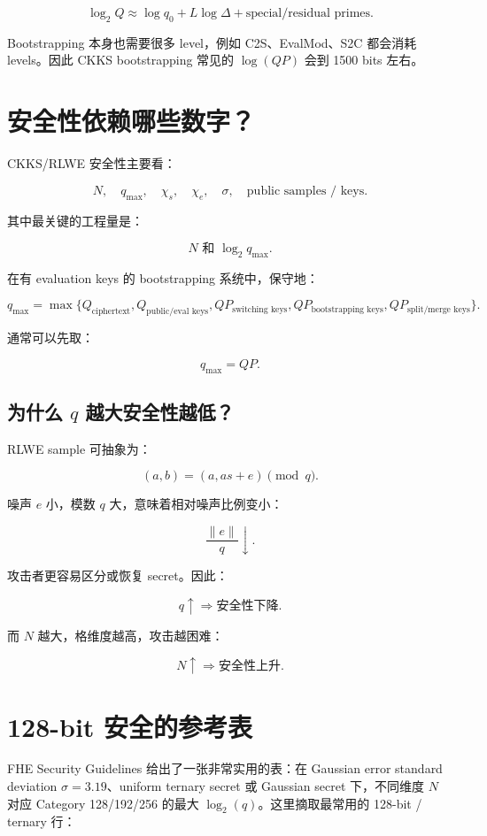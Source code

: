 \documentclass[UTF8,11pt,a4paper]{ctexart}
\begin{document}
\[
\log_2 Q \approx \log q_0 + L\log\Delta + \text{special/residual primes}.
\]

Bootstrapping 本身也需要很多 level，例如 C2S、EvalMod、S2C 都会消耗 levels。因此 CKKS bootstrapping 常见的 $\log(QP)$ 会到 1500 bits 左右。

\section{安全性依赖哪些数字？}

CKKS/RLWE 安全性主要看：

\[
\boxed{
N,\quad q_{\max},\quad \chi_s,\quad \chi_e,\quad \sigma,\quad \text{public samples / keys}.
}
\]

其中最关键的工程量是：

\[
\boxed{
N \text{ 和 } \log_2 q_{\max}.
}
\]

在有 evaluation keys 的 bootstrapping 系统中，保守地：

\[
q_{\max}
=
\max\{
Q_{\text{ciphertext}},
Q_{\text{public/eval keys}},
QP_{\text{switching keys}},
QP_{\text{bootstrapping keys}},
QP_{\text{split/merge keys}}
\}.
\]

通常可以先取：

\[
q_{\max}=QP.
\]

\subsection{为什么 $q$ 越大安全性越低？}

RLWE sample 可抽象为：

\[
(a,b)=(a,as+e)\pmod q.
\]

噪声 $e$ 小，模数 $q$ 大，意味着相对噪声比例变小：

\[
\frac{\|e\|}{q} \downarrow.
\]

攻击者更容易区分或恢复 secret。因此：

\[
\boxed{
q \uparrow \Rightarrow \text{安全性下降}.
}
\]

而 $N$ 越大，格维度越高，攻击越困难：

\[
\boxed{
N \uparrow \Rightarrow \text{安全性上升}.
}
\]

\section{128-bit 安全的参考表}

FHE Security Guidelines 给出了一张非常实用的表：在 Gaussian error standard deviation $\sigma=3.19$、uniform ternary secret 或 Gaussian secret 下，不同维度 $N$ 对应 Category 128/192/256 的最大 $\log_2(q)$。这里摘取最常用的 128-bit / ternary 行：
\end{document}
